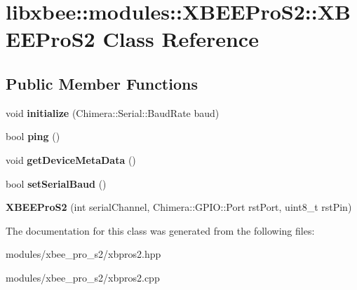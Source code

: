 \hypertarget{classlibxbee_1_1modules_1_1_x_b_e_e_pro_s2_1_1_x_b_e_e_pro_s2}{}\section{libxbee\+:\+:modules\+:\+:X\+B\+E\+E\+Pro\+S2\+:\+:X\+B\+E\+E\+Pro\+S2 Class Reference}
\label{classlibxbee_1_1modules_1_1_x_b_e_e_pro_s2_1_1_x_b_e_e_pro_s2}
\subsection*{Public Member Functions}
\begin{DoxyCompactItemize}
\item 
\mbox{\label{classlibxbee_1_1modules_1_1_x_b_e_e_pro_s2_1_1_x_b_e_e_pro_s2_a4bf905697159ee476f444816f1c35222}} 
void {\bfseries initialize} (Chimera\+::\+Serial\+::\+Baud\+Rate baud)
\item 
\mbox{\label{classlibxbee_1_1modules_1_1_x_b_e_e_pro_s2_1_1_x_b_e_e_pro_s2_a3055eedefeca28553db24dd6c926c2fb}} 
bool {\bfseries ping} ()
\item 
\mbox{\label{classlibxbee_1_1modules_1_1_x_b_e_e_pro_s2_1_1_x_b_e_e_pro_s2_a1ceb67774fcdb869e5309305cc4c89b6}} 
void {\bfseries get\+Device\+Meta\+Data} ()
\item 
\mbox{\label{classlibxbee_1_1modules_1_1_x_b_e_e_pro_s2_1_1_x_b_e_e_pro_s2_ac9bd6a4e42e68c6e427255197b0503d4}} 
bool {\bfseries set\+Serial\+Baud} ()
\item 
\mbox{\label{classlibxbee_1_1modules_1_1_x_b_e_e_pro_s2_1_1_x_b_e_e_pro_s2_a949a750c414ab5b988418f095b7b0f5b}} 
{\bfseries X\+B\+E\+E\+Pro\+S2} (int serial\+Channel, Chimera\+::\+G\+P\+I\+O\+::\+Port rst\+Port, uint8\+\_\+t rst\+Pin)
\end{DoxyCompactItemize}


The documentation for this class was generated from the following files\+:\begin{DoxyCompactItemize}
\item 
modules/xbee\+\_\+pro\+\_\+s2/xbpros2.\+hpp\item 
modules/xbee\+\_\+pro\+\_\+s2/xbpros2.\+cpp\end{DoxyCompactItemize}
